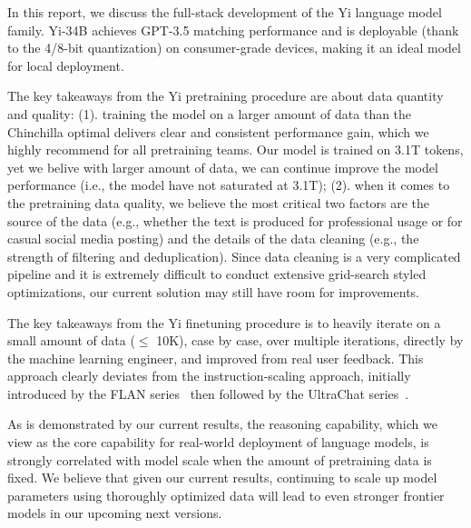 
In this report, we discuss the full-stack development of the Yi language model family. 
Yi-34B achieves GPT-3.5 matching performance and is deployable (thank to the 4/8-bit quantization) on consumer-grade devices, making it an ideal model for local deployment. 

The key takeaways from the Yi pretraining procedure are about data quantity and quality: 
(1). training the model on a larger amount of data than the Chinchilla optimal delivers clear and consistent performance gain, which we highly recommend for all pretraining teams. 
Our model is trained on 3.1T tokens, yet we belive with larger amount of data, we can continue improve the model performance (i.e., the model have not saturated at 3.1T);
(2). when it comes to the pretraining data quality, we believe the most critical two factors are the source of the data (e.g., whether the text is produced for professional usage or for casual social media posting) and the details of the data cleaning (e.g., the strength of filtering and deduplication). Since data cleaning is a very complicated pipeline and it is extremely difficult to conduct extensive grid-search styled optimizations, our current solution may still have room for improvements. 

The key takeaways from the Yi finetuning procedure is to heavily iterate on a small amount of data ($\le$ 10K), case by case, over multiple iterations, directly by the machine learning engineer, and improved from real user feedback. 
This approach clearly deviates from the instruction-scaling approach, initially introduced by the FLAN series~\citep{chung2022scaling} then followed by the UltraChat series~\citep{ding2023enhancing}. 



As is demonstrated by our current results, the reasoning capability, which we view as the core capability for real-world deployment of language models, is strongly correlated with model scale when the amount of pretraining data is fixed. 
We believe that given our current
results, continuing to scale up model parameters using thoroughly optimized data
will lead to even stronger frontier models in our upcoming next versions.